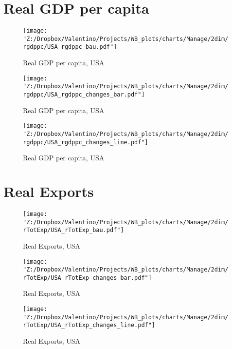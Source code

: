 \documentclass[12pt, letterpaper]{article}
\begin{document}
\newpage
\section{Real GDP per capita}
\begin{figure}[H]
\caption{Real GDP per capita, USA}
\label{fig_USA_rgdppc_bau}
\centering
\texttt{[image: "Z:/Dropbox/Valentino/Projects/WB\_plots/charts/Manage/2dim/rgdppc/USA\_rgdppc\_bau.pdf"]}
\end{figure}
\begin{figure}[H]
\caption{Real GDP per capita, USA}
\label{fig_USA_rgdppc_changes_bar}
\centering
\texttt{[image: "Z:/Dropbox/Valentino/Projects/WB\_plots/charts/Manage/2dim/rgdppc/USA\_rgdppc\_changes\_bar.pdf"]}
\end{figure}
\begin{figure}[H]
\caption{Real GDP per capita, USA}
\label{fig_USA_rgdppc_changes_line}
\centering
\texttt{[image: "Z:/Dropbox/Valentino/Projects/WB\_plots/charts/Manage/2dim/rgdppc/USA\_rgdppc\_changes\_line.pdf"]}
\end{figure}

\newpage
\section{Real Exports}
\begin{figure}[H]
\caption{Real Exports, USA}
\label{fig_USA_rTotExp_bau}
\centering
\texttt{[image: "Z:/Dropbox/Valentino/Projects/WB\_plots/charts/Manage/2dim/rTotExp/USA\_rTotExp\_bau.pdf"]}
\end{figure}
\begin{figure}[H]
\caption{Real Exports, USA}
\label{fig_USA_rTotExp_changes_bar}
\centering
\texttt{[image: "Z:/Dropbox/Valentino/Projects/WB\_plots/charts/Manage/2dim/rTotExp/USA\_rTotExp\_changes\_bar.pdf"]}
\end{figure}
\begin{figure}[H]
\caption{Real Exports, USA}
\label{fig_USA_rTotExp_changes_line}
\centering
\texttt{[image: "Z:/Dropbox/Valentino/Projects/WB\_plots/charts/Manage/2dim/rTotExp/USA\_rTotExp\_changes\_line.pdf"]}
\end{figure}
\end{document}
